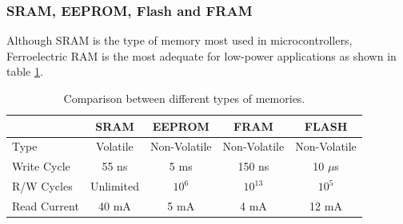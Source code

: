 \documentclass[11pt,a4paper]{report}
\begin{document}
\subsubsection{SRAM, EEPROM, Flash and FRAM}


Although SRAM is the type of memory most used in microcontrollers, Ferroelectric RAM is the most adequate for low-power applications as shown in table \ref{memoriescomparison}.

\begin{table}[ht!] \caption{Comparison between different types of memories. \cite{FRAMFujitsu} \cite{FRAMPres}}
\begin{tabular}{|l|c|c|c|c|}
\hline
                  & SRAM      & EEPROM               & FRAM                  & FLASH                \\ \hline
Type              & Volatile  & Non-Volatile         & Non-Volatile          & Non-Volatile         \\ \hline
Write Cycle       & 55 ns     & 5 ms                 & 150 ns                & 10 $\mu$s                \\ \hline
R/W Cycles & Unlimited & $10^6$ & $10^{13}$ & $10^5$ \\ \hline
Read Current      & 40 mA     & 5 mA                 & 4 mA                  & 12 mA                \\ \hline
\end{tabular}\label{memoriescomparison}
\end{table}




\end{document}
